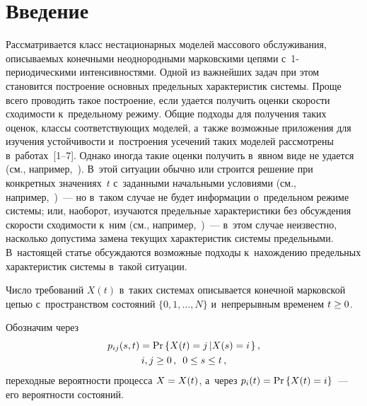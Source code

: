 
 



\thispagestyle{headings}

\begin{multicols}{2}

\label{st\stat}


\section{Введение}

Рассматривается класс нестационарных моделей массового обслуживания,
описываемых конечными неоднородными марковскими цепями 
с~1-пе\-рио\-ди\-че\-ски\-ми интенсивностями. Одной из важнейших задач при 
этом
становится по\-стро\-ение основных предельных характеристик системы.
Проще всего проводить такое построение, если удается получить оценки
скорости схо\-ди\-мости к~предельному режиму. Общие подходы для
получения таких оценок, классы соответствующих моделей, а~также
возможные приложения для изуче\-ния устойчивости и~построения усечений
таких моделей рассмотрены в~работах~[1--7]. Однако иногда такие
оценки получить в~явном виде не удается (см., 
например,~\cite{Markova20}). 
В~этой ситуации обычно или строится решение при
конкретных значениях~$t$ с~заданными начальными условиями (см.,
например,~\cite{aa2018, DiCrescenzo2016})~--- но в~таком случае не
будет информации о~предельном режиме системы; или, наоборот,
изучаются предельные характеристики без обсуждения скорости
сходимости к~ним (см., например,~\cite{Chakravarthy2017})~--- в~этом
случае неизвестно, насколько допустима замена текущих характеристик
системы предельными. В~настоящей статье обсуж\-да\-ют\-ся возможные
подходы к~нахождению предельных характеристик системы в~такой
ситуации.


Число требований $X(t)$ в~таких системах описывается конечной
марковской цепью с~пространством со\-сто\-яний $\{0, 1, \ldots, N\}$
 и~непрерывным временем $ t\hm \ge 0$.

Обозначим через 
\begin{multline*}
p_{ij}(s,t)=\mathrm{Pr}\left\{ X(t)=j\left| X(s)\hm=i\right.
\right\},\\
 i,j \ge 0\,,\enskip 0\leq s\leq t\,,
\end{multline*}
 переходные вероятности
процесса $X\hm=X(t)$, а~через $p_i(t)\hm=\mathrm{Pr}\left\{ X(t) \hm=i \right\}$~---
его вероятности со\-сто\-яний.


\end{multicols}
